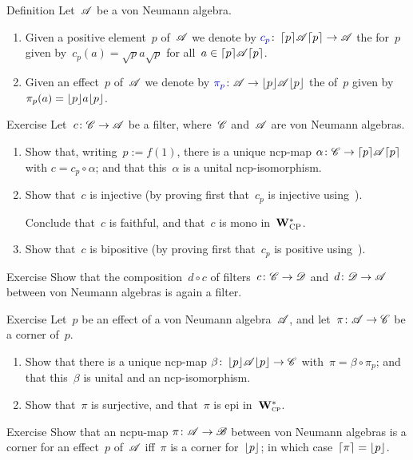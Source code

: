\documentclass[a]{subfiles}
\begin{document}
\begin{parsec}%
\begin{point}{Definition}%
Let~$\mathscr{A}$ be a von Neumann algebra.
\begin{enumerate}
\item
Given a positive element~$p$
of~$\mathscr{A}$
we denote
by $\Define{c_p}\colon \ceil{p}\!\scrA\!\ceil{p}\to\scrA$
the  for~$p$
given by~$c_p(a)=\sqrt{p}a\sqrt{p}$
for all~$a\in\left\lceil p\right\rceil\!\mathscr{A}\!\left\lceil p\right\rceil$.
\item
Given an effect~$p$ of~$\mathscr{A}$
we denote
by $\Define{\pi_p}\colon \scrA\to\floor{p}\!\scrA\!\floor{p}$
the  of~$p$
given by~$\pi_p(a)=\left\lfloor p\right\rfloor\!a\!\left\lfloor p\right\rfloor$.
\end{enumerate}
\end{point}
\begin{point}{Exercise}%
Let~$c\colon \mathscr{C}\to\mathscr{A}$ be a filter,
where~$\mathscr{C}$ and~$\mathscr{A}$ are von Neumann algebras.
\begin{enumerate}
\item
Show that, writing~$p:=f(1)$,
there is a unique
ncp-map $\alpha \colon \mathscr{C}\to \left\lceil p\right\rceil\!\mathscr{A}\!\left\lceil p\right\rceil$
with $c = c_p \circ \alpha$;
and that this~$\alpha$ is a unital ncp-isomorphism.
\item
Show that~$c$ is injective
(by proving first that~$c_p$ is injective
using~).

Conclude that~$c$
is faithful, and that~$c$ is mono in~$\mathbf{W}^*_{\text{\textsc{CP}}}$.
\item
Show that~$c$ is bipositive
(by proving first that~$c_p$
is positive using~).
\end{enumerate}
\end{point}
\begin{point}{Exercise}%
Show that the composition~$d\circ c$
of filters~$c\colon\mathscr{C}\to\mathscr{D}$
and~$d\colon \mathscr{D}\to\mathscr{A}$ 
between von Neumann algebras
is again a filter.
\end{point}
\begin{point}{Exercise}%
Let~$p$ be an effect of a von Neumann algebra~$\mathscr{A}$,
and let~$\pi\colon \mathscr{A}\to\mathscr{C}$ be a corner of~$p$.
\begin{enumerate}
\item
Show that there is a unique ncp-map
$\beta \colon \left\lfloor p\right\rfloor\!\mathscr{A}\!\left\lfloor p\right\rfloor\to\mathscr{C}$
with~$\pi = \beta\circ \pi_p$;
and that this~$\beta$ is unital and an ncp-isomorphism.
\item
Show that~$\pi$ is surjective, and that~$\pi$ is epi in~$\mathbf{W}^*_{\text{\textsc{cp}}}$.
\end{enumerate}
\end{point}
\begin{point}{Exercise}%
Show that an ncpu-map $\pi\colon \mathscr{A}\to\mathscr{B}$
between von Neumann algebras
is a corner for an effect~$p$ of~$\mathscr{A}$
iff~$\pi$ is a corner for~$\left\lfloor p\right\rfloor$;
in which case~$\left\lceil\pi\right\rceil=\left\lfloor p\right\rfloor$.


\end{point}
\end{parsec}
\end{document}
